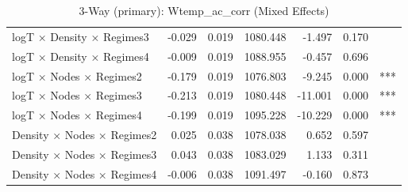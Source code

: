 \begin{table}[ht]
\begin{tabular}{lrrrrrl}
  logT × Density × Regimes3 & -0.029 & 0.019 & 1080.448 & -1.497 & 0.170 &  \\ 
  logT × Density × Regimes4 & -0.009 & 0.019 & 1088.955 & -0.457 & 0.696 &  \\ 
  logT × Nodes × Regimes2 & -0.179 & 0.019 & 1076.803 & -9.245 & 0.000 & *** \\ 
  logT × Nodes × Regimes3 & -0.213 & 0.019 & 1080.448 & -11.001 & 0.000 & *** \\ 
  logT × Nodes × Regimes4 & -0.199 & 0.019 & 1095.228 & -10.229 & 0.000 & *** \\ 
  Density × Nodes × Regimes2 & 0.025 & 0.038 & 1078.038 & 0.652 & 0.597 &  \\ 
  Density × Nodes × Regimes3 & 0.043 & 0.038 & 1083.029 & 1.133 & 0.311 &  \\ 
  Density × Nodes × Regimes4 & -0.006 & 0.038 & 1091.497 & -0.160 & 0.873 &  \\ 
   \hline
\end{tabular}
\caption{3-Way (primary): Wtemp_ac_corr (Mixed Effects)} 
\end{table}
